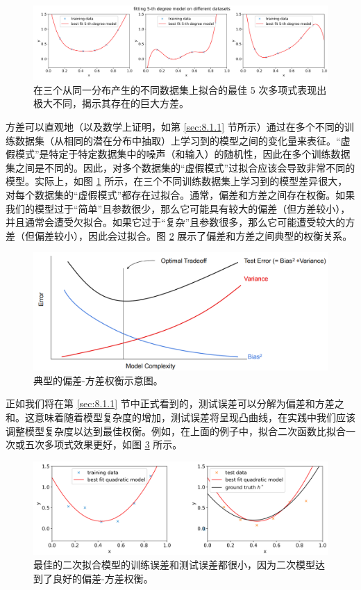 \begin{figure}[H]
    \centering
    \includegraphics[width=0.95\linewidth]{figs/fitting_5th_different.png}
    \caption{在三个从同一分布产生的不同数据集上拟合的最佳 5 次多项式表现出极大不同，揭示其存在的巨大方差。}
    \label{fig:8.7}
\end{figure}

方差可以直观地（以及数学上证明，如第 \ref{sec:8.1.1} 节所示）通过在多个不同的训练数据集（从相同的潜在分布中抽取）上学习到的模型之间的变化量来表征。“虚假模式”是特定于特定数据集中的噪声（和输入）的随机性，因此在多个训练数据集之间是不同的。因此，对多个数据集的“虚假模式”过拟合应该会导致非常不同的模型。实际上，如图 \ref{fig:8.7} 所示，在三个不同训练数据集上学习到的模型差异很大，对每个数据集的“虚假模式”都存在过拟合。通常，偏差和方差之间存在权衡。如果我们的模型过于“简单”且参数很少，那么它可能具有较大的偏差（但方差较小），并且通常会遭受欠拟合。如果它过于“复杂”且参数很多，那么它可能遭受较大的方差（但偏差较小），因此会过拟合。图 \ref{fig:8.8} 展示了偏差和方差之间典型的权衡关系。

\begin{figure}[H]
    \centering
    \includegraphics[width=0.9\linewidth]{figs/bias-variance_tradeoff.png}
    \caption{典型的偏差-方差权衡示意图。}
    \label{fig:8.8}
\end{figure}

正如我们将在第 \ref{sec:8.1.1} 节中正式看到的，测试误差可以分解为偏差和方差之和。这意味着随着模型复杂度的增加，测试误差将呈现凸曲线，在实践中我们应该调整模型复杂度以达到最佳权衡。例如，在上面的例子中，拟合二次函数比拟合一次或五次多项式效果更好，如图 \ref{fig:8.9} 所示。

\begin{figure}[H]
    \centering
    \includegraphics[width=0.8\linewidth]{figs/fitting_quadratic.png}
    \caption{最佳的二次拟合模型的训练误差和测试误差都很小，因为二次模型达到了良好的偏差-方差权衡。}
    \label{fig:8.9}
\end{figure}

